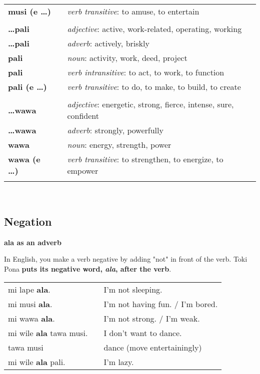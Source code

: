 \begin{supertabular}{p{2,5cm}|ll}
\textbf{musi (e \dots)} && \textit{verb transitive}: to amuse, to entertain \\ %
 && \\ %
\textbf{\dots pali} && \textit{adjective}: active, work-related, operating, working \\ %
\textbf{\dots pali} && \textit{adverb}: actively, briskly \\ %
\textbf{pali} && \textit{noun}: activity, work, deed, project \\ %
\textbf{pali} && \textit{verb intransitive}: to act, to work, to function \\ %
\textbf{pali (e \dots)} && \textit{verb transitive}: to do, to make, to build, to create \\ %
 && \\ %
\textbf{\dots wawa} && \textit{adjective}: energetic, strong, fierce, intense, sure, confident \\ %
\textbf{\dots wawa} && \textit{adverb}: strongly, powerfully \\ %
\textbf{wawa} && \textit{noun}: energy, strength, power \\ %
\textbf{wawa (e \dots)} && \textit{verb transitive}: to strengthen, to energize, to empower \\ %
 && \\ %
\end{supertabular} \\
%
\subsection*{Negation}
%
\textbf{ala as an adverb}

In English, you make a verb negative by adding "not" in front of the verb.
Toki Pona \textbf{puts its negative word, \textit{ala}, after the verb}. 

\begin{supertabular}{p{5,5cm}|ll}
mi lape \textbf{ala}. && I'm not sleeping. \\ 
mi musi \textbf{ala}. && I'm not having fun. / I'm bored. \\
mi wawa \textbf{ala}. && I'm not strong. / I'm weak. \\
mi wile \textbf{ala} tawa musi. && I don't want to dance. \\
tawa musi && dance (move entertainingly) \\
mi wile \textbf{ala} pali. && I'm lazy. \\
\end{supertabular} 

